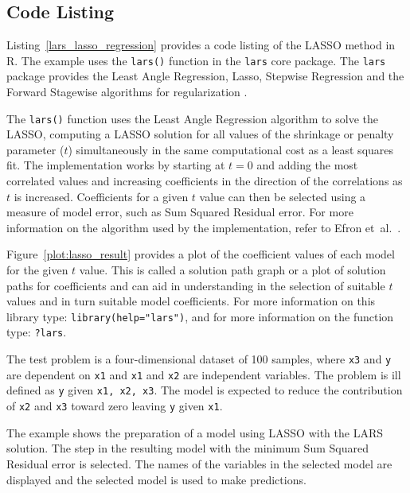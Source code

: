 \subsection{Code Listing}
Listing~\ref{lars_lasso_regression} provides a code listing of the LASSO method in R.
The example uses the \texttt{lars()} function in the \texttt{lars} core package. The \texttt{lars} package provides the Least Angle Regression, Lasso, Stepwise Regression and the Forward Stagewise algorithms for regularization \cite{Hastie2011}. 

The \texttt{lars()} function uses the Least Angle Regression algorithm to solve the LASSO, computing a LASSO solution for all values of the shrinkage or penalty parameter ($t$) simultaneously in the same computational cost as a least squares fit.
The implementation works by starting at $t=0$ and adding the most correlated values and increasing coefficients in the direction of the correlations as $t$ is increased. Coefficients for a given $t$ value can then be selected using a measure of model error, such as Sum Squared Residual error.
For more information on the algorithm used by the implementation, refer to Efron et~al.\ \cite{Efron2002}.

Figure~\ref{plot:lasso_result} provides a plot of the coefficient values of each model for the given $t$ value. This is called a solution path graph or a plot of solution paths for coefficients and can aid in understanding in the selection of suitable $t$ values and in turn suitable model coefficients. For more information on this library type: \texttt{library(help="lars")}, and for more information on the function type: \texttt{?lars}.

The test problem is a four-dimensional dataset of 100 samples, where \texttt{x3} and \texttt{y} are dependent on \texttt{x1} and \texttt{x1} and \texttt{x2} are independent variables. The problem is ill defined as \texttt{y} given \texttt{x1, x2, x3}. The model is expected to reduce the contribution of \texttt{x2} and \texttt{x3} toward zero leaving \texttt{y} given \texttt{x1}.


The example shows the preparation of a model using LASSO with the LARS solution. The step in the resulting model with the minimum Sum Squared Residual error is selected. The names of the variables in the selected model are displayed and the selected model is used to make predictions.

